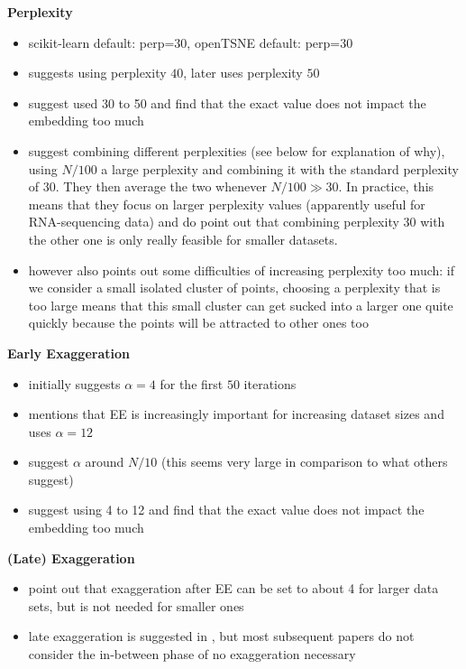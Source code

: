 \textbf{Perplexity}
\begin{itemize}
  \item scikit-learn default: perp=30, openTSNE default: perp=30
  \item \cite{vdMaa08} suggests using perplexity $40$, later \cite{vdMaa14} uses perplexity $50$ 
  \item \cite{belkina19} suggest used 30 to 50 and find that the exact value does not impact the embedding too much 
  \item \cite{KoBe19SingleCell} suggest combining different perplexities (see below for explanation of why), using $N/100$ a large perplexity and combining it with the standard perplexity of $30$. They then average the two whenever $N/100 \gg 30$. In practice, this means that they focus on larger perplexity values (apparently useful for RNA-sequencing data) and do point out that combining perplexity 30 with the other one is only really feasible for smaller datasets. 
  \item \cite{KoBe19SingleCell} however also points out some difficulties of increasing perplexity too much: if we consider a small isolated cluster of points, choosing a perplexity that is too large means that this small cluster can get sucked into a larger one quite quickly because the points will be attracted to other ones too 
\end{itemize}

\textbf{Early Exaggeration}
\begin{itemize}
  \item \cite{vdMaa08} initially suggests $\alpha = 4$ for the first $50$ iterations 
  \item \cite{vdMaa14} mentions that EE is increasingly important for increasing dataset sizes and uses $\alpha = 12$
  \item \cite{LinStei22} suggest $\alpha$ around $N/10$ (this seems very large in comparison to what others suggest)
  \item \cite{belkina19} suggest using 4 to 12 and find that the exact value does not impact the embedding too much 
\end{itemize}

\textbf{(Late) Exaggeration}
\begin{itemize}
  \item \cite{KoBe19SingleCell} point out that exaggeration after EE can be set to about 4 for larger data sets, but is not needed for smaller ones 
  \item late exaggeration is suggested in \cite{Lin19}, but most subsequent papers do not consider the in-between phase of no exaggeration necessary 
\end{itemize}

